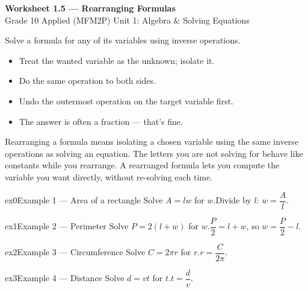 \documentclass[11pt]{article}
\begin{document}
\begin{center}
{\LARGE\bfseries\color{titleblue}Worksheet 1.5 --- Rearranging Formulas}\\[2pt]
{\small Grade 10 Applied (MFM2P) \textperiodcentered{} Unit 1: Algebra \& Solving Equations}
\end{center}

\begin{ideabox}
Solve a formula for any of its variables using inverse operations.
\begin{itemize}[leftmargin=*,itemsep=2pt]
  \item Treat the wanted variable as the unknown; isolate it.
  \item Do the same operation to both sides.
  \item Undo the outermost operation on the target variable first.
  \item The answer is often a fraction — that's fine.
\end{itemize}
\end{ideabox}

\begin{learnbox}
Rearranging a formula means isolating a chosen variable using the same inverse operations as solving an equation.
The letters you are not solving for behave like constants while you rearrange.
A rearranged formula lets you compute the variable you want directly, without re-solving each time.
\end{learnbox}


\begin{example}{ex0}{Example 1 --- Area of a rectangle}
Solve $A=lw$ for $w$.\soln Divide by $l$: $w=\dfrac{A}{l}$.
\end{example}

\begin{example}{ex1}{Example 2 --- Perimeter}
Solve $P=2(l+w)$ for $w$.\soln $\dfrac{P}{2}=l+w$, so $w=\dfrac{P}{2}-l$.
\end{example}

\begin{example}{ex2}{Example 3 --- Circumference}
Solve $C=2\pi r$ for $r$.\soln $r=\dfrac{C}{2\pi}$.
\end{example}

\begin{example}{ex3}{Example 4 --- Distance}
Solve $d=vt$ for $t$.\soln $t=\dfrac{d}{v}$.
\end{example}
\end{document}
